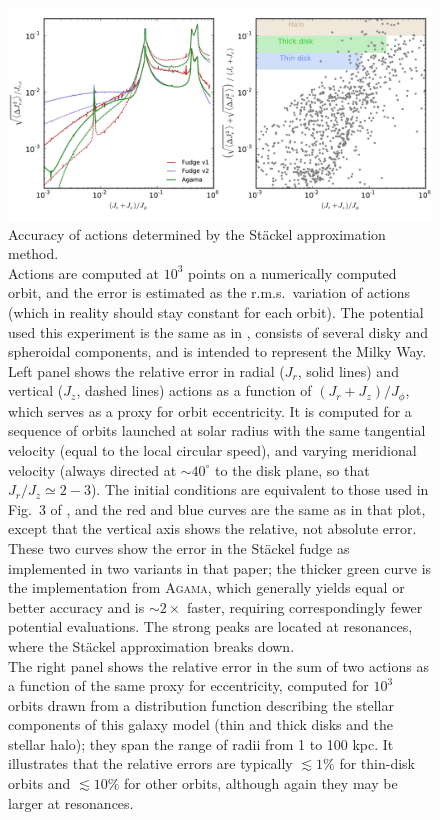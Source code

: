 \documentclass[12pt]{article}
\newcommand{\Agama}{\textsc{Agama}\xspace}
\begin{document}
\begin{figure}
\includegraphics[width=16cm]{StaeckelFudgeAccuracy.pdf}
\caption{Accuracy of actions determined by the St\"ackel approximation method. \protect\\
Actions are computed at $10^3$ points on a numerically computed orbit, and the error is estimated as the r.m.s.\ variation of actions (which in reality should stay constant for each orbit). The potential used this experiment is the same as in \cite{SandersBinney2016}, consists of several disky and spheroidal components, and is intended to represent the Milky Way. \protect\\
Left panel shows the relative error in radial ($J_r$, solid lines) and vertical ($J_z$, dashed lines) actions as a function of $(J_r+J_z)/J_\phi$, which serves as a proxy for orbit eccentricity. It is computed for a sequence of orbits launched at solar radius with the same tangential velocity (equal to the local circular speed), and varying meridional velocity (always directed at $\sim40^\circ$ to the disk plane, so that $J_r/J_z\simeq 2-3$). The initial conditions are equivalent to those used in Fig.~3 of \cite{SandersBinney2016}, and the red and blue curves are the same as in that plot, except that the vertical axis shows the relative, not absolute error. These two curves show the error in the St\"ackel fudge as implemented in two variants in that paper; the thicker green curve is the implementation from \Agama, which generally yields equal or better accuracy and is $\sim 2\times$ faster, requiring correspondingly fewer potential evaluations. The strong peaks are located at resonances, where the St\"ackel approximation breaks down. \protect\\
The right panel shows the relative error in the sum of two actions as a function of the same proxy for eccentricity, computed for $10^3$ orbits drawn from a distribution function describing the stellar components of this galaxy model (thin and thick disks and the stellar halo); they span the range of radii from 1 to 100 kpc. It illustrates that the relative errors are typically $\lesssim 1\%$ for thin-disk orbits and $\lesssim 10\%$ for other orbits, although again they may be larger at resonances.
}  \label{fig:StaeckelAccuracy}
\end{figure}
\end{document}
